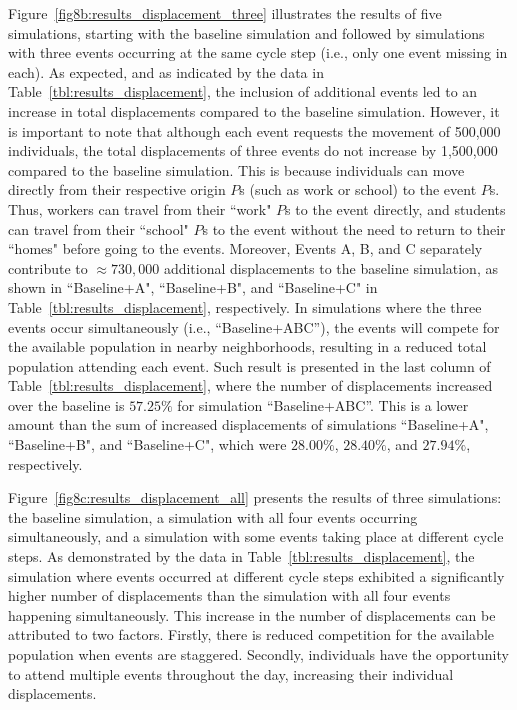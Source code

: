 \documentclass[pdflatex,sn-mathphys-num]{sn-jnl}%
\theoremstyle{thmstyleone}%
\theoremstyle{thmstyletwo}%
\theoremstyle{thmstylethree}%
\begin{document}
Figure~\ref{fig8b:results_displacement_three} illustrates the results of five simulations, starting with the baseline simulation and followed by simulations with three events occurring at the same cycle step (i.e., only one event missing in each). 
As expected, and as indicated by the data in Table~\ref{tbl:results_displacement}, the inclusion of additional events led to an increase in total displacements compared to the baseline simulation. However, it is important to note that although each event requests the movement of 500,000 individuals, the total displacements of three events do not increase by 1,500,000 compared to the baseline simulation. This is because individuals can move directly from their respective origin $P$s (such as work or school) to the event $P$s. Thus, workers can travel from their ``work" $P$s to the event directly, and students can travel from their ``school" $P$s to the event without the need to return to their ``homes" before going to the events. Moreover, Events A, B, and C separately contribute to $\approx730,000$ additional displacements to the baseline simulation, as shown in ``Baseline+A", ``Baseline+B", and ``Baseline+C" in Table~\ref{tbl:results_displacement}, respectively.
In simulations where the three events occur simultaneously (i.e., ``Baseline+ABC''), the events will compete for the available population in nearby neighborhoods, resulting in a reduced total population attending each event. Such result is presented in the last column of Table~\ref{tbl:results_displacement}, where the number of displacements increased over the baseline is $57.25\%$ for simulation ``Baseline+ABC''. This is a lower amount than the sum of increased displacements of simulations ``Baseline+A", ``Baseline+B", and ``Baseline+C", which were $28.00\%$, $28.40\%$, and $27.94\%$, respectively.

Figure~\ref{fig8c:results_displacement_all} presents the results of three simulations: the baseline simulation, a simulation with all four events occurring simultaneously, and a simulation with some events taking place at different cycle steps. As demonstrated by the data in Table~\ref{tbl:results_displacement}, the simulation where events occurred at different cycle steps exhibited a significantly higher number of displacements than the simulation with all four events happening simultaneously. This increase in the number of displacements
can be attributed to two factors. Firstly, there is reduced competition for the available population when events are staggered. Secondly, individuals have the opportunity to attend multiple events throughout the day, increasing their individual displacements.
\end{document}
